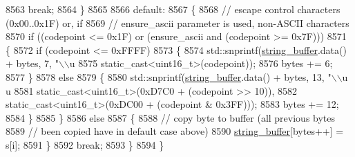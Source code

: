 \begin{DoxyCode}
8563                             \textcolor{keywordflow}{break};
8564                         \}
8565 
8566                         \textcolor{keywordflow}{default}:
8567                         \{
8568                             \textcolor{comment}{// escape control characters (0x00..0x1F) or, if}
8569                             \textcolor{comment}{// ensure\_ascii parameter is used, non-ASCII characters}
8570                             \textcolor{keywordflow}{if} ((codepoint <= 0x1F) or (ensure\_ascii and (codepoint >= 0x7F)))
8571                             \{
8572                                 \textcolor{keywordflow}{if} (codepoint <= 0xFFFF)
8573                                 \{
8574                                     std::snprintf(\hyperlink{classnlohmann_1_1detail_1_1serializer_a9c9b7ca63a66e59e5e7ffe8a2acf5c8f}{string\_buffer}.data() + bytes, 7, \textcolor{stringliteral}{"\(\backslash\)\(\backslash\)u%
8575                                                   \textcolor{keyword}{static\_cast<}uint16\_t\textcolor{keyword}{>}(codepoint));
8576                                     bytes += 6;
8577                                 \}
8578                                 \textcolor{keywordflow}{else}
8579                                 \{
8580                                     std::snprintf(\hyperlink{classnlohmann_1_1detail_1_1serializer_a9c9b7ca63a66e59e5e7ffe8a2acf5c8f}{string\_buffer}.data() + bytes, 13, \textcolor{stringliteral}{"\(\backslash\)\(\backslash\)u%
      u%
8581                                                   \textcolor{keyword}{static\_cast<}uint16\_t\textcolor{keyword}{>}(0xD7C0 + (codepoint >> 10)),
8582                                                   \textcolor{keyword}{static\_cast<}uint16\_t\textcolor{keyword}{>}(0xDC00 + (codepoint & 0x3FF)));
8583                                     bytes += 12;
8584                                 \}
8585                             \}
8586                             \textcolor{keywordflow}{else}
8587                             \{
8588                                 \textcolor{comment}{// copy byte to buffer (all previous bytes}
8589                                 \textcolor{comment}{// been copied have in default case above)}
8590                                 \hyperlink{classnlohmann_1_1detail_1_1serializer_a9c9b7ca63a66e59e5e7ffe8a2acf5c8f}{string\_buffer}[bytes++] = s[i];
8591                             \}
8592                             \textcolor{keywordflow}{break};
8593                         \}
8594                     \}
}}
\end{DoxyCode}
